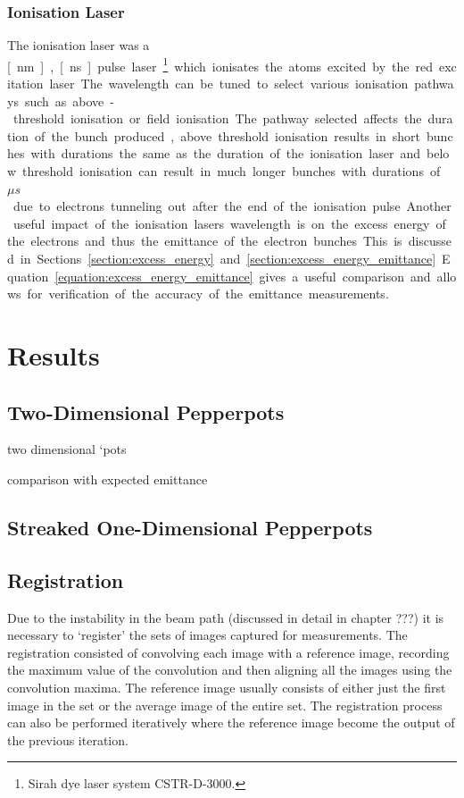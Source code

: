 \subsubsection{Ionisation Laser}
The ionisation laser was a \unit[457-493][nm], \unit[10][ns] pulse laser\footnote{Sirah dye laser system CSTR-D-3000.} which ionisates the atoms excited by the red excitation laser.
The wavelength can be tuned to select various ionisation pathways such as above-threshold ionisation or field ionisation.
The pathway selected affects the duration of the bunch produced, above threshold ionisation results in short bunches with durations the same as the duration of the ionisation laser and below threshold ionisation can result in much longer bunches with durations of \unit[10s]{$\mu s$} due to electrons tunneling out after the end of the ionisation pulse.

Another useful impact of the ionisation lasers wavelength is on the excess energy of the electrons and thus the emittance of the electron bunches.
This is discussed in Sections~\ref{section:excess_energy} and \ref{section:excess_energy_emittance}.
Equation~\ref{equation:excess_energy_emittance} gives a useful comparison and allows for verification of the accuracy of the emittance measurements.

\section{Results}

\subsection{Two-Dimensional Pepperpots}

two dimensional `pots

comparison with expected emittance

\subsection{Streaked One-Dimensional Pepperpots}

\subsection{Registration}
Due to the instability in the beam path {\color{red}(discussed in detail in chapter ???)} it is necessary to `register' the sets of images captured for measurements.
The registration consisted of convolving each image with a reference image, recording the maximum value of the convolution and then aligning all the images using the convolution maxima.
The reference image usually consists of either just the first image in the set or the average image of the entire set.
The registration process can also be performed iteratively where the reference image become the output of the previous iteration.

